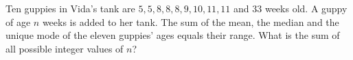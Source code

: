 Ten guppies in Vida's tank are $5,5,8,8,8,9,10,11,11$ and $33$ weeks old. A guppy of age $n$ weeks is added to her tank. The sum of the mean, the median and the unique mode of the eleven guppies' ages equals their range. What is the sum of all possible integer values of $n$?
